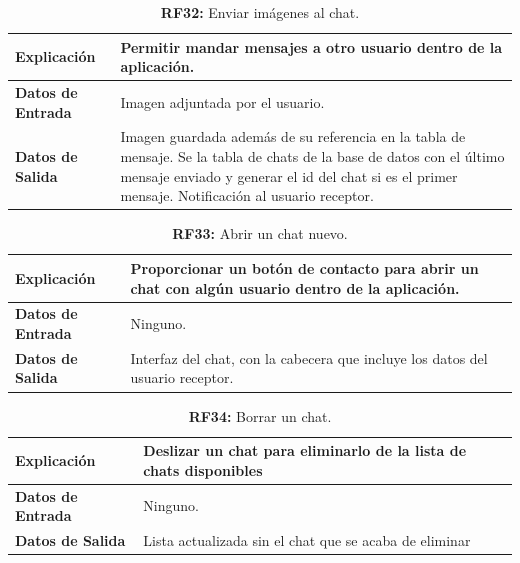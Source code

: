 \documentclass[a4paper, 12pt]{article}
\begin{document}
\begin{table}[H]
\captionsetup{justification=raggedright,singlelinecheck=false}
\caption{\textbf{RF32:} Enviar imágenes al chat.}
\label{tab:RF32}
	\begin{tabular}{|m{5cm}|m{10cm}|}
\hline
	\textbf{Explicación} & Permitir mandar mensajes a otro usuario dentro de la aplicación. \\ 
	\hline
	\textbf{Datos de Entrada} & Imagen adjuntada por el usuario. \\ 
	\hline
	\textbf{Datos de Salida} & Imagen guardada además de su referencia en la tabla de mensaje. Se la tabla de chats de la base de datos con el último mensaje enviado y generar el id del chat si es el primer mensaje. Notificación al usuario receptor. \\ 
	\hline
\end{tabular}
\end{table}


\begin{table}[H]
\captionsetup{justification=raggedright,singlelinecheck=false}
\caption{\textbf{RF33:} Abrir un chat nuevo.}
\label{tab:RF33}
	\begin{tabular}{|m{5cm}|m{10cm}|}
	\hline
	\textbf{Explicación} & Proporcionar un botón de contacto para abrir un chat con algún usuario dentro de la aplicación. \\ 
	\hline
	\textbf{Datos de Entrada} & Ninguno. \\ 
	\hline
	\textbf{Datos de Salida} & Interfaz del chat, con la cabecera que incluye los datos del usuario receptor. \\ 
	\hline
\end{tabular}
\end{table}

\begin{table}[H]
\captionsetup{justification=raggedright,singlelinecheck=false}
\caption{\textbf{RF34:} Borrar un chat.}
\label{tab:RF34}
	\begin{tabular}{|m{5cm}|m{10cm}|}
	\hline
	\textbf{Explicación} & Deslizar un chat para eliminarlo de la lista de chats disponibles \\ 
	\hline
	\textbf{Datos de Entrada} & Ninguno. \\ 
	\hline
	\textbf{Datos de Salida} & Lista actualizada sin el chat que se acaba de eliminar \\ 
	\hline
\end{tabular}
\end{table}
\end{document}
